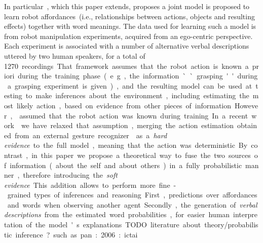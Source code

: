 In particular~\cite{salvi:2012:smcb}, which this paper extends, proposes a joint model is proposed to learn robot affordances~(i.e., relationships between actions, objects and resulting effects) together with word meanings.
The data used for learning such a model is from robot manipulation experiments, acquired from an ego-centric perspective.
Each experiment is associated with a number of alternative verbal descriptions uttered by two human speakers, for a total of \SI{1270}~recordings.
That framework assumes that the robot action is known a~priori during the training phase~(e.g., the information ``grasping'' during a grasping experiment is given), and the resulting model can be used at testing to make inferences about the environment, including estimating the most likely action, based on evidence from other pieces of information.
However,~\cite{salvi:2012:smcb} assumed that the robot action was known during training.
In a recent work~\cite{saponaro:2017:glu} we have relaxed that assumption, merging the action estimation obtained from an external gesture recognizer~\cite{saponaro:2013:crhri} as a \emph{hard evidence} to the full model, meaning that the action was deterministic.
By contrast, in this paper we propose a theoretical way to fuse the two sources of information~(about the self and about others) in a fully probabilistic manner, therefore introducing the \emph{soft evidence}.
This addition allows to perform more fine-grained types of inferences and reasoning. %
First, predictions over affordances and words when observing another agent.
Secondly, the generation of \emph{verbal descriptions} from the estimated word probabilities, for easier human interpretation of the model's explanations.

TODO literature about theory/probabilistic inference? such as pan:2006:ictai \cite{pan:2006:ictai}



